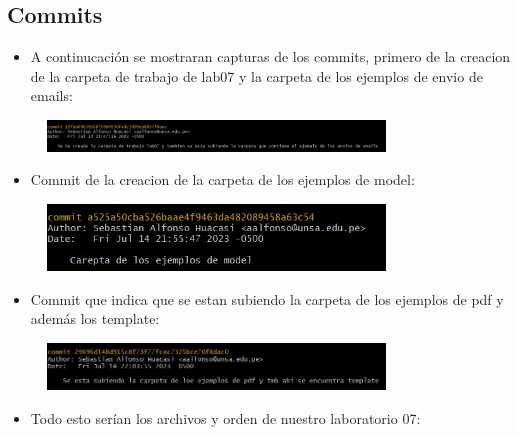 \subsection{Commits}
\begin{itemize}	
	\item A continucación se mostraran capturas de los commits, primero de la creacion de la carpeta de trabajo de lab07 y la carpeta de los ejemplos de envio de emails:
\end{itemize}	
\begin{figure}[H]
	\centering
	\includegraphics[width=0.8\textwidth,keepaspectratio]{img/1commit.jpg}
\end{figure}
\begin{itemize}	
	\item Commit de la creacion de la carpeta de los ejemplos de model:
\end{itemize}
\begin{figure}[H]
	\centering
	\includegraphics[width=0.8\textwidth,keepaspectratio]{img/2commit.jpg}
\end{figure}
\begin{itemize}	
	\item Commit que indica que se estan subiendo la carpeta de los ejemplos de pdf y además los template:
\end{itemize}
\begin{figure}[H]
	\centering
	\includegraphics[width=0.8\textwidth,keepaspectratio]{img/3commit.jpg}
\end{figure}
\begin{itemize}	
	\item Todo esto serían los archivos y orden de nuestro laboratorio 07:
\end{itemize}	
